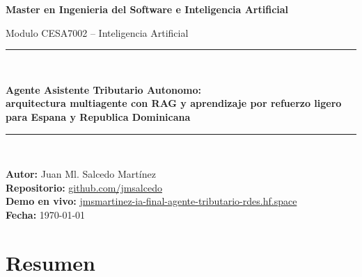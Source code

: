 \documentclass[11pt,a4paper]{article}
\begin{document}
\begin{titlepage}
  \centering
  \vspace*{1cm}

  {\Large \textbf{Master en Ingenieria del Software e Inteligencia Artificial}\par}
  \vspace{0.4cm}
  {\large Modulo CESA7002 -- Inteligencia Artificial\par}
  \vspace{2cm}

  \rule{\textwidth}{1pt}\\[0.4cm]
  {\Huge\bfseries Agente Asistente Tributario Autonomo:\\[0.2cm]
  arquitectura multiagente con RAG y aprendizaje por refuerzo ligero para Espana y Republica Dominicana \par}
  \vspace{0.3cm}
  \rule{\textwidth}{1pt}\\

  \vfill

  \begin{flushright}
  \textbf{Autor:} Juan Ml. Salcedo Martínez \\
  \textbf{Repositorio:} \href{https://github.com/jmsalcedo/ia_final_agente-tributario-rdes}{github.com/jmsalcedo} \\
  \textbf{Demo en vivo:} \href{https://jmsmartinez-ia-final-agente-tributario-rdes.hf.space/}{jmsmartinez-ia-final-agente-tributario-rdes.hf.space} \\
  \textbf{Fecha:} \today
  \end{flushright}

  \vspace{2cm}
\end{titlepage}

\tableofcontents
\newpage

\section*{Resumen}
\end{document}
